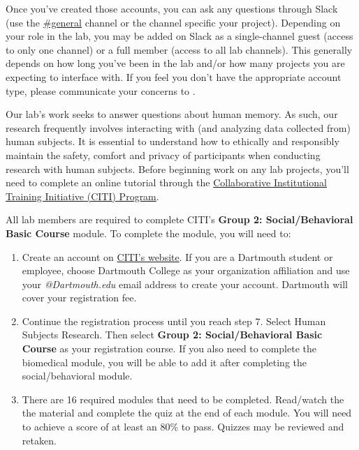 \documentclass{tufte-book} %
\begin{document}
Once you've created those accounts, you can ask any questions through
Slack (use the
\href{https://context-lab.slack.com/messages/general/}{\#general}
channel or the channel specific your project).  Depending on your role
in the lab, you may be added on Slack as a single-channel guest
(access to only one channel) or a full member (access to all lab
channels).  This generally depends on how long you've been in the lab
and/or how many projects you are expecting to interface with.  If you
feel you don't have the appropriate account type, please communicate
your concerns to \director.


\noindent Our lab's work seeks to answer questions about human memory.
As such, our research frequently involves interacting with (and
analyzing data collected from) human subjects. It is essential to
understand how to ethically and responsibly maintain the safety,
comfort and privacy of participants when conducting research with
human subjects. Before beginning work on any lab projects, you'll need
to complete an online tutorial through the
\href{https://about.citiprogram.org} {Collaborative Institutional
  Training Initiative (CITI) Program}.

\noindent All lab members are required to complete CITI's
\textbf{Group 2: Social/Behavioral Basic Course} module.  To complete
the module, you will need to:
\begin{enumerate}
\item Create an account on \href{https://about.citiprogram.org}{CITI's
    website}.  If you are a Dartmouth student or employee, choose
  Dartmouth College as your organization affiliation and use your
  \textit{@Dartmouth.edu} email address to create your account.
  Dartmouth will cover your registration fee.
\item Continue the registration process until you reach step 7. Select
  Human Subjects Research. Then select \textbf{Group 2:
    Social/Behavioral Basic Course} as your registration course.  If
  you also need to complete the biomedical module, you will be able to
  add it after completing the social/behavioral module.
\item There are 16 required modules that need to be
  completed. Read/watch the the material and complete the quiz at the
  end of each module. You will need to achieve a score of at least an
  80\% to pass. Quizzes may be reviewed and retaken.
\end{enumerate}
\end{document}
